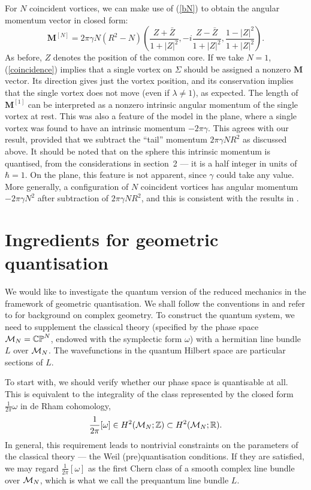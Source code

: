 \documentclass[a4paper,11pt]{article}
\begin{document}
For $N$ coincident vortices, we can make use of (\ref{bN}) to obtain the
angular momentum vector in closed form:
\begin{equation}\label{coincidence}
\mathbf{M}^{[N]}=2\pi\gamma N(R^{2}-N)
\left(   
\frac{Z+\bar{Z}}{1+|Z|^{2}},
-i\frac{Z-\bar{Z}}{1+|Z|^{2}},
\frac{1-|Z|^{2}}{1+|Z|^{2}}
\right).
\end{equation}
As before, $Z$ denotes the position of the common core.
If we take $N=1$, (\ref{coincidence}) implies that
a single vortex on $\Sigma$ should be assigned a nonzero $\mathbf{M}$ 
vector. Its direction gives just the vortex position, and its conservation 
implies that the single vortex does not move (even if $\lambda\ne 1$), 
as expected. The length of $\mathbf{M}^{[1]}$ can be interpreted as a
nonzero intrinsic angular momentum of the single vortex at rest. This
was also a feature of the model in the plane, where a single vortex
was found to have an
intrinsic momentum $-2\pi\gamma$. This agrees with our result, provided
that we subtract the ``tail'' momentum $2\pi\gamma N R^{2}$ as discussed
above. It should be noted that on the sphere this intrinsic momentum
is quantised, from the considerations in section~2 --- it is a half 
integer in units of $\hbar=1$. On the
plane, this feature is not apparent, since $\gamma$ could take any
value. More generally, a configuration of $N$ coincident vortices has
angular momentum $-2\pi\gamma N^{2}$ after subtraction of 
$2\pi\gamma N R^{2}$, and this is consistent with the results in \cite{MNcl}.



\section{Ingredients for geometric quantisation}


We would like to investigate the quantum version of the reduced
mechanics in the framework of geometric quantisation.
We shall follow the conventions in 
\cite{Woo} and refer to \cite{GH}
for background on complex geometry. 
To construct the quantum system, we need to supplement the classical 
theory (specified by the phase space 
${\cal M}_{N}=\mathbb{CP}^{N}$, endowed with the symplectic form 
$\omega$) with a hermitian line bundle $L$ over ${\cal M}_{N}$.
The wavefunctions in the quantum Hilbert space are particular 
sections of $L$.

To start with, we should verify whether our phase space is quantisable
at all. This is equivalent to the integrality of the class represented
by the closed form $\frac{1}{2\pi}\omega$ in de Rham cohomology,
\begin{equation} \label{Weil}
\frac{1}{2\pi}[\omega] \in H^{2}({\cal M}_{N};\mathbb{Z})\subset 
H^{2}({\cal M}_{N};\mathbb{R}).
\end{equation}
In general, this requirement leads to nontrivial constraints on the
parameters of the classical theory --- the Weil (pre)quantisation
conditions. If they are satisfied, we may regard
$\frac{1}{2\pi}[\omega]$ as the
first Chern class of a smooth complex line bundle over ${\cal M}_{N}$,
which is what we call the prequantum line bundle $L$. 
\end{document}
